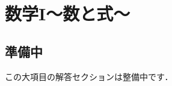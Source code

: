 \documentclass[../../ms_a.tex]{subfiles}
\begin{document}
\section{数学I～数と式～}

\subsection*{準備中}
この大項目の解答セクションは整備中です．
\end{document}
